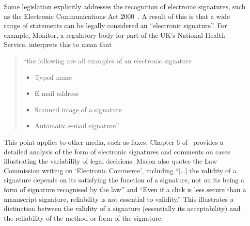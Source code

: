 \documentclass{article}
\def\citeN{\citet}
\def\cite{\citep}
\begin{document}
Some legislation explicitly addresses the recognition of electronic
signatures, such as the Electronic Communications Act
2000~\cite{ECA2000}.  
A result of this is that a wide range of statements can be legally considered an
``electronic signature''.  For example, Monitor, a regulatory body for
part of the UK's National Health Service, interprets this to mean that 
\begin{quote}
  ``the following are all examples of an electronic signature
  \begin{itemize}
  \item Typed name \item E-mail address \item Scanned image of a signature \item
    Automatic e-mail
    signature''~\cite{Monitor08}
  \end{itemize}
\end{quote}
This point applies to other media, such as faxes.
Chapter 6 of~\citeN{Mason12} provides a detailed analysis of the form of electronic signatures and comments on cases illustrating the variability of legal decisions.  
Mason also quotes the Law Commission writing on `Electronic Commerce', including ``[\ldots] the validity of a signature depends on its satisfying the function of a signature, not on its being a form of signature recognised by the law'' and ``Even if a click is less secure than a manuscript signature, reliability is not essential to validity.''  
This illustrates a distinction between the validity of a signature (essentially its acceptability) and the reliability of the method or form of the signature.
\end{document}
